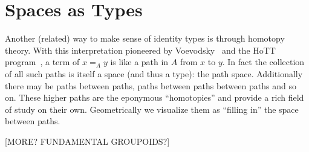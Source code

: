 \section{Spaces as Types}\label{sec:spaces}

Another (related) way to make sense of identity types is through homotopy theory. With
this interpretation pioneered by Voevodsky~\cite{voevodsky2014} and the HoTT
program~\cite{hottbook}, a term of $x =_A y$ is like a path in $A$ from $x$ to
$y$.
In fact the collection of all such paths is itself a space (and thus a type):
the path space. Additionally there may be paths between paths, paths between
paths between paths and so on. These higher paths are the eponymous
``homotopies'' and provide a rich field of study on their own.
Geometrically we visualize them as ``filling in'' the space between paths.

[MORE? FUNDAMENTAL GROUPOIDS?]